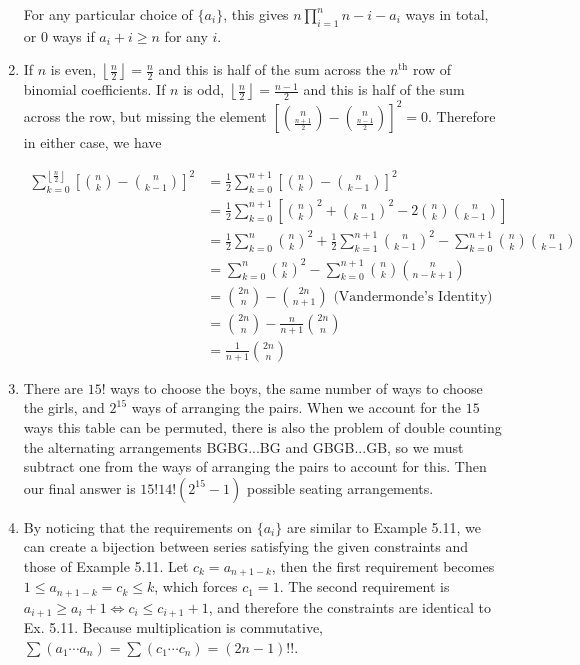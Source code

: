 \documentclass{book}
\numberwithin{equation}{section}
\begin{document}
\begin{enumerate}[label={9.\arabic*}]
For any particular choice of $\{a_i\}$, this gives $n \prod_{i=1}^n n - i - a_i$ ways in total, or 0 ways if $a_i + i \geq n$ for
any $i$.

\item
If $n$ is even, $\left \lfloor \frac{n}{2} \right \rfloor = \frac{n}{2}$ and this is half of the sum across the $n^{\text{th}}$
row of binomial coefficients. If $n$ is odd, $\left \lfloor \frac{n}{2} \right \rfloor = \frac{n-1}{2}$ and this is half of the
sum across the row, but missing the element $\left[{n \choose \frac{n+1}{2}} - {n \choose \frac{n-1}{2}}\right]^2 = 0$.
Therefore in either case, we have

\begin{align*}
\sum_{k=0}^{\left\lfloor \frac{n}{2} \right\rfloor} \left[{n \choose k} - {n \choose k-1}\right]^2 & = \frac{1}{2}\sum_{k=0}^{n+1} \left[{n \choose k} - {n \choose k-1}\right]^2 \\
& = \frac{1}{2}\sum_{k=0}^{n+1} \left[{n \choose k}^2 + {n \choose k-1}^2 - 2{n \choose k}{n \choose k-1}\right] \\
& = \frac{1}{2}\sum_{k=0}^n {n \choose k}^2 + \frac{1}{2}\sum_{k=1}^{n+1}{n \choose k-1}^2 - \sum_{k=0}^{n+1}{n \choose k}{n \choose k-1} \\
& = \sum_{k=0}^n {n \choose k}^2 - \sum_{k=0}^{n+1}{n \choose k}{n \choose n-k+1} \\
& = {2n \choose n} - {2n \choose n+1} \text{ (Vandermonde's Identity)} \\
& = {2n \choose n} - \frac{n}{n+1}{2n \choose n} \\
& = \frac{1}{n+1}{2n \choose n}
\end{align*}

\item
There are $15!$ ways to choose the boys, the same number of ways to choose the girls, and $2^{15}$ ways of
arranging the pairs. When we account for the $15$ ways this table can be permuted, there is also the problem
of double counting the alternating arrangements BGBG...BG and GBGB...GB, so we must
subtract one from the ways of arranging the pairs to account for this. Then our final answer is $15!14!(2^{15} - 1)$
possible seating arrangements.

\item
By noticing that the requirements on $\{a_i\}$ are similar to Example 5.11, we can create a bijection between
series satisfying the given constraints and those of Example 5.11. Let $c_k = a_{n+1 - k}$, then the first
requirement becomes $1 \leq a_{n + 1 - k} = c_k \leq k$, which forces $c_1 = 1$. The second requirement is
$a_{i+1} \geq a_i + 1 \iff c_i \leq c_{i+1} + 1$, and therefore the constraints are identical to Ex. 5.11. Because
multiplication is commutative, $\sum (a_1 \cdots a_n) = \sum (c_1 \cdots c_n) = (2n-1)!!$.


\end{enumerate}
\end{document}
